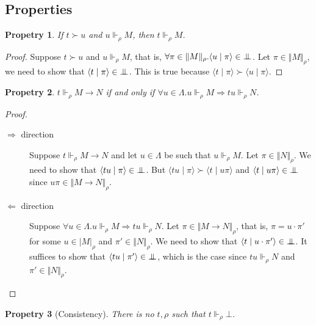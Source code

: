 \documentclass{article}
\newcommand{\proc}[2]{\langle{#1}\mid{#2}\rangle}
\newcommand{\pole}{{\bot\mkern-10mu\bot}}
\newcommand{\realizes}{\Vdash}
\newcommand{\terminterp}[2]{\Vert #1 \Vert_{#2}}
\newcommand{\truthinterp}[2]{\vert #1 \vert_{#2}}
\newtheorem{property}{Propetry}
\begin{document}
\subsection{Properties}

\begin{property}
    If $t \succ u$ and $u \realizes_\rho M$, then $t \realizes_\rho M$.
\end{property}

\begin{proof}
    Suppose $t \succ u$ and $u \realizes_\rho M$, that is, $\forall \pi \in \terminterp{M}{\rho}. \proc{u}{\pi} \in \pole$.
    Let $\pi \in \terminterp{M}{\rho}$, we need to show that $\proc{t}{\pi} \in \pole$.
    This is true because $\proc{t}{\pi} \succ \proc{u}{\pi}$.
\end{proof}

\begin{property}\label{impliesintro}
    $t \realizes_\rho M \rightarrow N$ if and only if $\forall u \in \Lambda. u \realizes_\rho M \Rightarrow t u \realizes_\rho N$.
\end{property}

\begin{proof}
    \
    \begin{description}
        \item[$\Rightarrow$ direction] Suppose $t \realizes_\rho M \rightarrow N$ and let $u \in \Lambda$ be such that $u \realizes_\rho M$.
        Let $\pi \in \terminterp{N}{\rho}$.
        We need to show that $\proc{tu}{\pi} \in \pole$.
        But $\proc{tu}{\pi} \succ \proc{t}{u\pi}$ and $\proc{t}{u\pi} \in \pole$ since $u\pi \in \terminterp{M \rightarrow N}{\rho}$.
        \item[$\Leftarrow$ direction] Suppose $\forall u \in \Lambda. u \realizes_\rho M \Rightarrow t u \realizes_\rho N$.
        Let $\pi \in \terminterp{M \rightarrow N}{\rho}$, that is, $\pi = u \cdot \pi'$ for some $u \in \truthinterp{M}{\rho}$ and $\pi' \in \terminterp{N}{\rho}$.
        We need to show that $\proc{t}{u \cdot \pi'} \in \pole$.
        It suffices to show that $\proc{tu}{\pi'} \in \pole$, which is the case since $tu \realizes_\rho N$ and $\pi' \in \terminterp{N}{\rho}$.
    \end{description}
\end{proof}

\begin{property}[Consistency]
    There is no $t, \rho$ such that $t \realizes_\rho \bot$.
\end{property}
\end{document}
